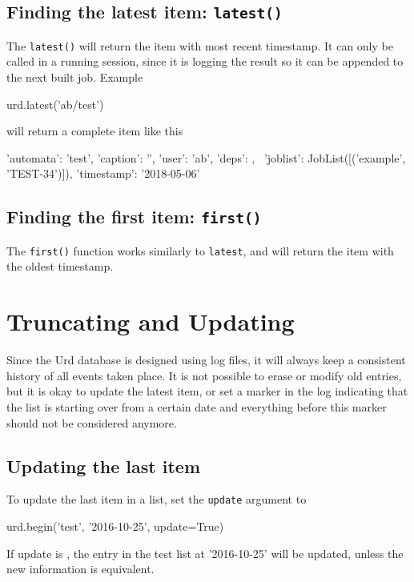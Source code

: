 \subsection{Finding the latest item:  \texttt{latest()}}
The \texttt{latest()} will return the item with most recent timestamp.
It can only be called in a running session, since it is logging the
result so it can be appended to the next built job.  Example
\begin{python}
urd.latest('ab/test')
\end{python}
will return a complete item like this
\begin{shell}
{'automata': 'test', 'caption': '', 'user': 'ab', 'deps': {}, \
 'joblist': JobList([('example', 'TEST-34')]), 'timestamp': '2018-05-06'}
\end{shell}


\subsection{Finding the first item:  \texttt{first()}}
The \texttt{first()} function works similarly to \texttt{latest}, and
will return the item with the oldest timestamp.



\section{Truncating and Updating}
\label{sec:trunc-update}
Since the Urd database is designed using log files, it will always
keep a consistent history of all events taken place.  It is not
possible to erase or modify old entries, but it is okay to update the
latest item, or set a marker in the log indicating that the list is
starting over from a certain date and everything before this marker
should not be considered anymore.

\subsection{Updating the last item}
To update the last item in a list, set the \texttt{update} argument
to \pyTrue
\begin{python}
urd.begin('test', '2016-10-25', update=True)
\end{python}
If update is \pyTrue, the entry in the test list at '2016-10-25' will
be updated, unless the new information is equivalent.

